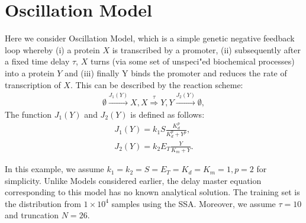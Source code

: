 \documentclass[a4paper,10pt]{article}
\begin{document}
\section{Oscillation Model}
Here we consider Oscillation Model, which is a simple genetic negative feedback loop whereby (i) a protein $X$ is transcribed by a promoter, (ii) subsequently after a fixed time delay $\tau$, $X$ turns (via some set of unspeci"ed biochemical processes) into a protein $Y$ and (iii) finally Y binds the promoter and reduces the rate of transcription of $X$. This can be described by the reaction scheme:
\begin{equation}\label{oscillation}
	\begin{aligned}
		\emptyset \xrightarrow{J_1(Y)} X,
		X\stackrel{\tau}\Rightarrow Y,
		Y\xrightarrow{J_2(Y)} \emptyset,
	\end{aligned}
\end{equation}
The function $J_1(Y)$ and $J_2(Y)$ is defined as follows:
\begin{equation}\label{oscillation}
	\begin{aligned}
	J_1(Y)=k_1S\frac{K^p_d}{K^p_d+Y^p},\\
	J_2(Y)=k_2E_T\frac{Y}{K_m+Y}.
	\end{aligned}
\end{equation}

In this example, we assume $k_1=k_2=S=E_T=K_d=K_m=1, p=2$ for simplicity. Unlike Models considered earlier, the delay master equation corresponding to this model has no known analytical solution. The training set is the distribution from $1 \times 10^4$ samples using the SSA. Moreover, we assume $\tau=10$ and truncation $N=26$.
\end{document}
